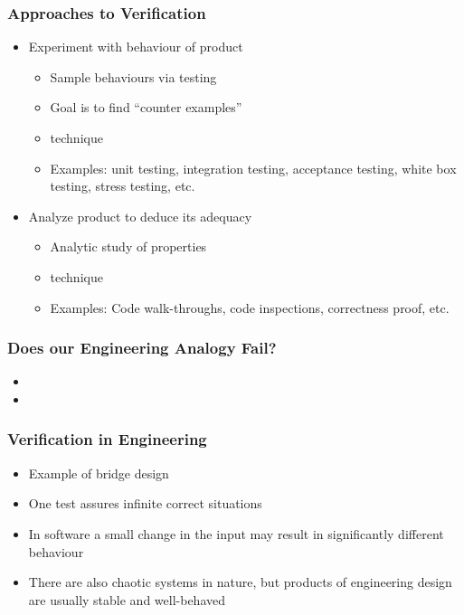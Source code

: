 \documentclass[t,12pt,numbers,fleqn]{beamer}
\begin{document}
\begin{frame}
\frametitle{Approaches to Verification}

\begin{itemize}

\item Experiment with behaviour of product
\begin{itemize}
\item Sample behaviours via testing
\item Goal is to find ``counter examples''
\item {} technique
\item Examples: unit testing, integration testing, acceptance testing, white box
  testing, stress testing, etc.
\end{itemize}
\item Analyze product to deduce its adequacy
\begin{itemize}
\item Analytic study of properties
\item {} technique
\item Examples: Code walk-throughs, code inspections, correctness proof, etc.
\end{itemize}

\end{itemize}

\end{frame}


\begin{frame}
\frametitle{Does our Engineering Analogy Fail?}

\begin{itemize}

\item {}
\item {}

\end{itemize}

\end{frame}


\begin{frame}
\frametitle{Verification in Engineering}

\begin{itemize}

\item Example of bridge design
\item One test assures infinite correct situations
\item In software a small change in the input may result in significantly different behaviour
\item There are also chaotic systems in nature, but products of engineering
  design are usually stable and well-behaved
\end{itemize}

\end{frame}
\end{document}
